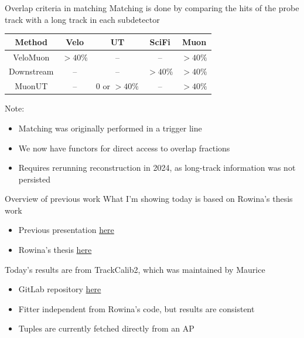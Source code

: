 \documentclass[xcolor={dvipsnames}]{beamer}
\begin{document}
\begin{frame}{Overlap criteria in matching}
  \vspace{0.0cm}
  {Matching is done by comparing the hits of the probe track with a long track in each subdetector}
  \vspace{0.2cm}
  \begin{center}
    \begin{tabular}{ccccc}
      \hline
      Method     & Velo     & UT              & SciFi    & Muon \\
      \hline
      VeloMuon   & $> 40\%$ & --              & --       & $> 40\%$ \\
      Downstream & --       & --              & $> 40\%$ & $> 40\%$ \\
      MuonUT     & --       & $0$ or $> 40\%$ & --       & $> 40\%$ \\
      \hline
    \end{tabular}
  \end{center}
  {Note:}
  \begin{itemize}
    \item{Matching was originally performed in a trigger line}
    \item{We now have functors for direct access to overlap fractions}
    \item{Requires rerunning reconstruction in 2024, as long-track information was not persisted}
  \end{itemize}
\end{frame}

\begin{frame}{Overview of previous work}
  \vspace{0.0cm}
  {What I'm showing today is based on Rowina's thesis work}
  \vspace{0.2cm}
  \begin{itemize}
    \setlength\itemsep{0.8em}
    \item{Previous presentation \href{https://indico.cern.ch/event/1577588/\#6-status-tracking-efficiencies}{here}}
    \item{Rowina's thesis \href{https://repository.cern/records/n2g9v-81z15}{here}}
  \end{itemize}
  \vspace{0.5cm}
  {Today's results are from TrackCalib2, which was maintained by Maurice}
  \vspace{0.2cm}
  \begin{itemize}
    \setlength\itemsep{0.8em}
    \item{GitLab repository \href{https://gitlab.cern.ch/lhcb-rta/trackcalib2}{here}}
    \item{Fitter independent from Rowina's code, but results are consistent}
    \item{Tuples are currently fetched directly from an AP}
  \end{itemize}
\end{frame}
\end{document}
